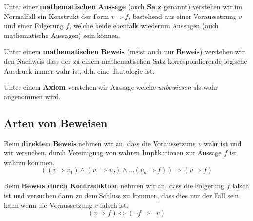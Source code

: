\documentclass[../../main.tex]{subfiles}
\begin{document}
	
	\begin{definition}
		\label{def:MathematischeAussage}
		Unter einer \textbf{mathematischen Aussage} (auch \textbf{Satz} genannt) verstehen wir im Normalfall ein Konstrukt der Form $v \Rightarrow f$, bestehend aus einer Voraussetzung $v$ und einer Folgerung $f$, welche beide ebenfalls wiederum \hyperref[def:Aussage]{Aussagen} (auch mathematische Aussagen) sein können.
	\end{definition}

	\begin{definition}
		\label{def:MathematischerBeweis}
		Unter einem \textbf{mathematischen Beweis} (meist auch nur \textbf{Beweis}) verstehen wir den Nachweis dass der zu einem mathematischen Satz korrespondierende logische Ausdruck immer wahr ist, d.h. eine Tautologie ist.
	\end{definition}

	\begin{definition}[Axiom]
		Unter einem \textbf{Axiom} verstehen wir Aussage welche \textit{unbewiesen} als wahr angenommen wird. 
	\end{definition}



	\subsection{Arten von Beweisen}
	
	\begin{definition}
		Beim \textbf{direkten Beweis} nehmen wir an, dass die Voraussetzung $v$ wahr ist und wir versuchen, durch Vereinigung von wahren Implikationen zur Aussage \dq$f$ ist wahr\dq zu kommen.
		$$((v \Rightarrow v_1) \land (v_1 \Rightarrow v_2) \land ... (v_n \Rightarrow f)) \Rightarrow (v \Rightarrow f)$$
	\end{definition}

	\begin{definition}
		Beim \textbf{Beweis durch Kontradiktion} nehmen wir an, dass die Folgerung $f$ falsch ist und versuchen dann zu dem Schluss zu kommen, dass dies nur der Fall sein kann wenn die Voraussetzung $v$ falsch ist. 
		$$(v \Rightarrow f) \Leftrightarrow (\lnot f \Rightarrow \lnot v)$$
	\end{definition}
\end{document}
